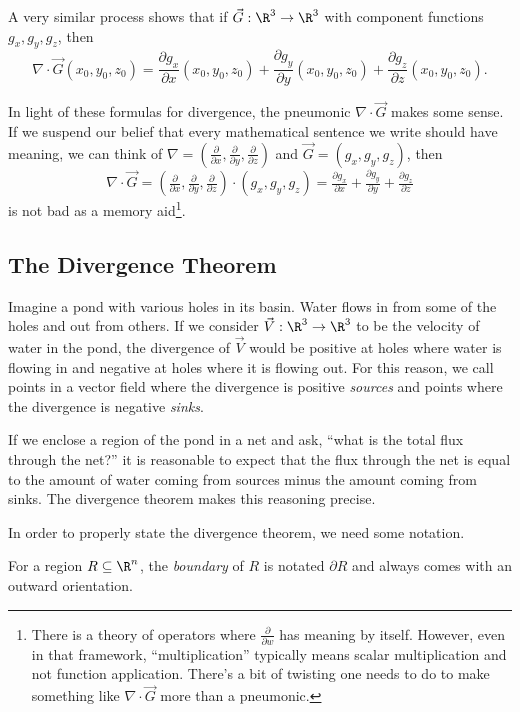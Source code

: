 A very similar process shows that if $\vec G:\R^3\to\R^3$ with component functions
$g_x,g_y,g_z$, then
\[
	\nabla \cdot \vec G(x_0,y_0,z_0) = \frac{\partial g_x}{\partial x}(x_0,y_0,z_0)
	+ \frac{\partial g_y}{\partial y}(x_0,y_0, z_0) + \frac{\partial g_z}{\partial z}(x_0,y_0, z_0).
\]

In light of these formulas for divergence, the
pneumonic $\nabla \cdot \vec G$ makes some sense.  If we suspend our belief
that every mathematical sentence we write should have meaning, we can think of 
$\nabla =(\tfrac{\partial}{\partial x},\tfrac{\partial}{\partial y},\tfrac{\partial}{\partial z})$
and $\vec G=(g_x,g_y,g_z)$, then
\[
	\nabla \cdot \vec G=(\tfrac{\partial}{\partial x},\tfrac{\partial}{\partial y},\tfrac{\partial}{\partial z})
	\cdot 
	(g_x,g_y,g_z)
	=\tfrac{\partial g_x}{\partial x}+\tfrac{\partial g_y}{\partial y}+\tfrac{\partial g_z}{\partial z}
\]
is not bad as a memory aid\footnote{ There is a theory of operators where $\tfrac{\partial }{\partial w}$
has meaning by itself.  However, even in that framework, ``multiplication'' typically means 
scalar multiplication and not function application.  There's a bit of twisting one needs to do
to make something like $\nabla \cdot \vec G$ more than a pneumonic.}.  


\subsection{The Divergence Theorem}

Imagine a pond with various holes in its basin. Water flows in
from some of the holes and out from others.  If we consider $\vec V:\R^3\to\R^3$
to be the velocity of water in the pond, the divergence of $\vec V$ would
be positive at holes where water is flowing in and negative 
at holes where it is flowing out.  For this reason, we call points in a vector
field where the divergence is positive \emph{sources}
and points where the divergence is negative \emph{sinks}.

If we enclose a region of the pond in a net and ask, ``what is the total
flux through the net\mbox{?}'' it is reasonable to expect that the flux
through the net is equal to the amount of water coming from sources minus
the amount coming from sinks.  The divergence theorem makes this reasoning
precise.

In order to properly state the divergence theorem, we need some notation.

\begin{definition}[Boundary]
	For a region $R\subseteq \R^n$, the \emph{boundary}
	of $R$ is notated $\partial R$ and always comes with an outward orientation.
\end{definition}

